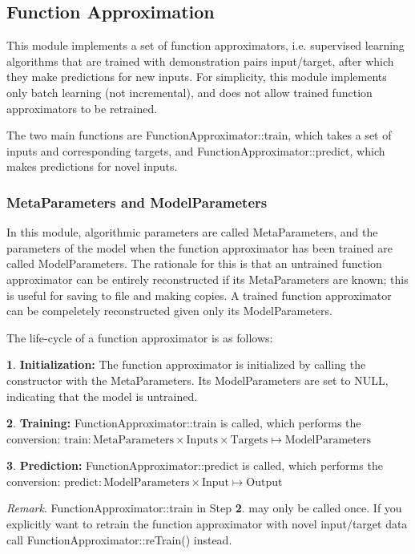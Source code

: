 \hypertarget{page_func_approx_sec_fa}{}\subsection{Function Approximation}\label{page_func_approx_sec_fa}
This module implements a set of function approximators, i.\+e. supervised learning algorithms that are trained with demonstration pairs input/target, after which they make predictions for new inputs. For simplicity, this module implements only batch learning (not incremental), and does not allow trained function approximators to be retrained.

The two main functions are Function\+Approximator\+::train, which takes a set of inputs and corresponding targets, and Function\+Approximator\+::predict, which makes predictions for novel inputs.\hypertarget{page_func_approx_sec_fa_metaparameters}{}\subsubsection{Meta\+Parameters and Model\+Parameters}\label{page_func_approx_sec_fa_metaparameters}
In this module, algorithmic parameters are called Meta\+Parameters, and the parameters of the model when the function approximator has been trained are called Model\+Parameters. The rationale for this is that an untrained function approximator can be entirely reconstructed if its Meta\+Parameters are known; this is useful for saving to file and making copies. A trained function approximator can be compeletely reconstructed given only its Model\+Parameters.

The life-\/cycle of a function approximator is as follows\+:

{\bfseries 1}. {\bfseries Initialization\+:} The function approximator is initialized by calling the constructor with the Meta\+Parameters. Its Model\+Parameters are set to N\+U\+L\+L, indicating that the model is untrained.

{\bfseries 2}. {\bfseries Training\+:} Function\+Approximator\+::train is called, which performs the conversion\+: $ \mbox{train}: \mbox{MetaParameters} \times \mbox{Inputs} \times \mbox{Targets} \mapsto \mbox{ModelParameters} $

{\bfseries 3}. {\bfseries Prediction\+:} Function\+Approximator\+::predict is called, which performs the conversion\+: $ \mbox{predict}: \mbox{ModelParameters} \times \mbox{Input} \mapsto \mbox{Output}$

{\itshape Remark}. Function\+Approximator\+::train in Step {\bfseries 2}. may only be called once. If you explicitly want to retrain the function approximator with novel input/target data call Function\+Approximator\+::re\+Train() instead.

